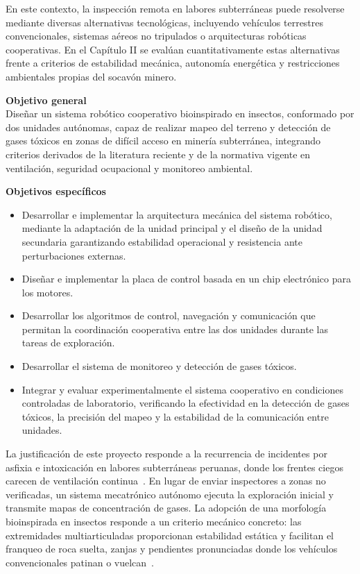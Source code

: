 En este contexto, la inspección remota en labores subterráneas puede resolverse mediante diversas alternativas tecnológicas, incluyendo vehículos terrestres convencionales, sistemas aéreos no tripulados o arquitecturas robóticas cooperativas. En el Capítulo II se evalúan cuantitativamente estas alternativas frente a criterios de estabilidad mecánica, autonomía energética y restricciones ambientales propias del socavón minero.



\textbf{Objetivo general} \\
Diseñar un sistema robótico cooperativo bioinspirado en insectos, conformado por dos unidades autónomas, capaz de realizar mapeo del terreno y detección de gases tóxicos en zonas de difícil acceso en minería subterránea, integrando criterios derivados de la literatura reciente y de la normativa vigente en ventilación, seguridad ocupacional y monitoreo ambiental.

\textbf{Objetivos específicos}
\begin{itemize}
    \item Desarrollar e implementar la arquitectura mecánica del sistema robótico, mediante la adaptación de la unidad principal y el diseño de la unidad secundaria garantizando estabilidad operacional y resistencia ante perturbaciones externas.
    \item Diseñar e implementar la placa de control basada en un chip electrónico para los motores.
    \item Desarrollar los algoritmos de control, navegación y comunicación que permitan la coordinación cooperativa entre las dos unidades durante las tareas de exploración.
    \item Desarrollar el sistema de monitoreo y detección de gases tóxicos.
    \item Integrar y evaluar experimentalmente el sistema cooperativo en condiciones controladas de laboratorio, verificando la efectividad en la detección de gases tóxicos, la precisión del mapeo y la estabilidad de la comunicación entre unidades.
\end{itemize}

La justificación de este proyecto responde a la recurrencia de incidentes por asfixia e intoxicación en labores subterráneas peruanas, donde los frentes ciegos carecen de ventilación continua~\cite{OSINERGMIN_BoletinGSM_2020, MINEM_Yanaquihua_2023}. En lugar de enviar inspectores a zonas no verificadas, un sistema mecatrónico autónomo ejecuta la exploración inicial y transmite mapas de concentración de gases. La adopción de una morfología bioinspirada en insectos responde a un criterio mecánico concreto: las extremidades multiarticuladas proporcionan estabilidad estática y facilitan el franqueo de roca suelta, zanjas y pendientes pronunciadas donde los vehículos convencionales patinan o vuelcan~\cite{InsectInspired_2020, DungBeetle_2023_Cybernetics}.

